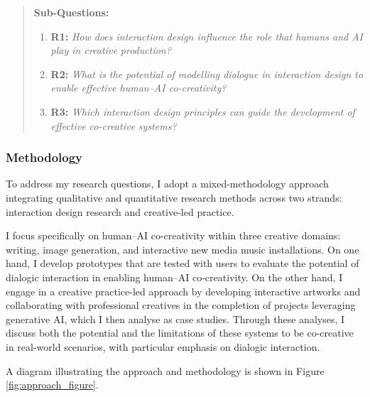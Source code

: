 \begin{quote}
\textbf{Sub-Questions:}
\begin{enumerate}
    \item \textbf{R1:} \emph{How does interaction design influence the role that humans and AI play in creative production?}
    \item \textbf{R2:} \emph{What is the potential of modelling dialogue in interaction design to enable effective human–AI co-creativity?}
    \item \textbf{R3:} \emph{Which interaction design principles can guide the development of effective co-creative systems?}
\end{enumerate}
\end{quote}

\subsubsection{Methodology}
To address my research questions, I adopt a mixed-methodology approach integrating qualitative and quantitative research methods across two strands: interaction design research and creative-led practice.

I focus specifically on human–AI co-creativity within three creative domains: writing, image generation, and interactive new media music installations. On one hand, I develop prototypes that are tested with users to evaluate the potential of dialogic interaction in enabling human–AI co-creativity. On the other hand, I engage in a creative practice-led approach by developing interactive artworks and collaborating with professional creatives in the completion of projects leveraging generative AI, which I then analyse as case studies. Through these analyses, I discuss both the potential and the limitations of these systems to be co-creative in real-world scenarios, with particular emphasis on dialogic interaction.

A diagram illustrating the approach and methodology is shown in Figure \ref{fig:approach_figure}.


